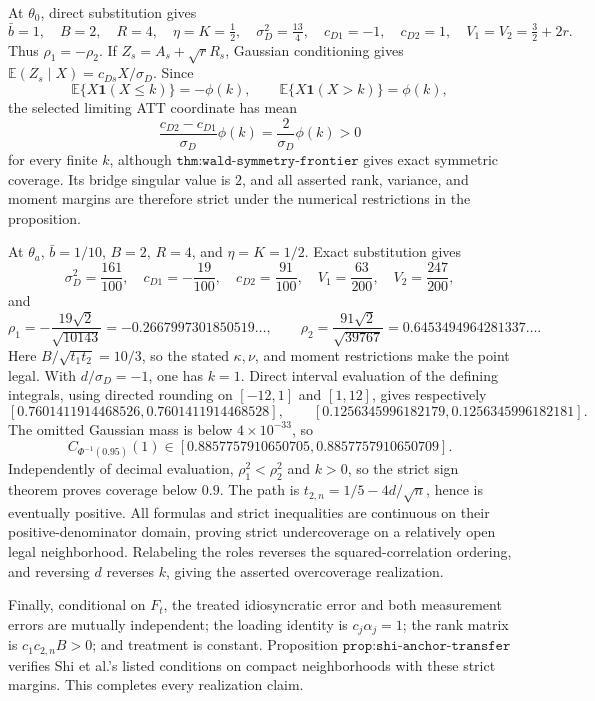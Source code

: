 At \(\theta_0\), direct substitution gives
\[
 \bar b=1,\quad B=2,\quad R=4,\quad \eta=K=\tfrac12,
 \quad \sigma_D^2=\tfrac{13}4,\quad c_{D1}=-1,\quad c_{D2}=1,
 \quad V_1=V_2=\tfrac32+2r.
\]
Thus \(\rho_1=-\rho_2\).  If \(Z_s=A_s+\sqrt rR_s\), Gaussian conditioning gives \(\mathbb E(Z_s\mid X)=c_{Ds}X/\sigma_D\).  Since
\[
 \mathbb E\{X\mathbf1(X\leq k)\}=-\phi(k),\qquad
 \mathbb E\{X\mathbf1(X>k)\}=\phi(k),
\]
the selected limiting ATT coordinate has mean
\[
 \frac{c_{D2}-c_{D1}}{\sigma_D}\phi(k)=\frac2{\sigma_D}\phi(k)>0
\]
for every finite \(k\), although \(\texttt{thm:wald-symmetry-frontier}\) gives exact symmetric coverage.  Its bridge singular value is \(2\), and all asserted rank, variance, and moment margins are therefore strict under the numerical restrictions in the proposition.

At \(\theta_a\), \(\bar b=1/10\), \(B=2\), \(R=4\), and \(\eta=K=1/2\).  Exact substitution gives
\[
 \sigma_D^2=\frac{161}{100},\quad c_{D1}=-\frac{19}{100},
 \quad c_{D2}=\frac{91}{100},\quad
 V_1=\frac{63}{200},\quad V_2=\frac{247}{200},
\]
and
\[
 \rho_1=-\frac{19\sqrt2}{\sqrt{10143}}=-0.2667997301850519\ldots,
 \qquad
 \rho_2=\frac{91\sqrt2}{\sqrt{39767}}=0.6453494964281337\ldots.
\]
Here \(B/\sqrt{t_1t_2}=10/3\), so the stated \(\kappa,\nu\), and moment restrictions make the point legal.  With \(d/\sigma_D=-1\), one has \(k=1\).  Direct interval evaluation of the defining integrals, using directed rounding on \([-12,1]\) and \([1,12]\), gives respectively
\[
 [0.7601411914468526,0.7601411914468528],
 \qquad
 [0.1256345996182179,0.1256345996182181].
\]
The omitted Gaussian mass is below \(4\times10^{-33}\), so
\[
 C_{\Phi^{-1}(0.95)}(1)
 \in[0.8857757910650705,0.8857757910650709].
\]
Independently of decimal evaluation, \(\rho_1^2<\rho_2^2\) and \(k>0\), so the strict sign theorem proves coverage below \(0.9\).  The path is \(t_{2,n}=1/5-4d/\sqrt n\), hence is eventually positive.  All formulas and strict inequalities are continuous on their positive-denominator domain, proving strict undercoverage on a relatively open legal neighborhood.  Relabeling the roles reverses the squared-correlation ordering, and reversing \(d\) reverses \(k\), giving the asserted overcoverage realization.

Finally, conditional on \(F_t\), the treated idiosyncratic error and both measurement errors are mutually independent; the loading identity is \(c_j\alpha_j=1\); the rank matrix is \(c_1c_{2,n}B>0\); and treatment is constant.  Proposition \(\texttt{prop:shi-anchor-transfer}\) verifies Shi et al.'s listed conditions on compact neighborhoods with these strict margins.  This completes every realization claim.

